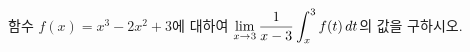 함수 $f(x)=x^3-2x^2+3$에 대하여 $\displaystyle\lim_{x\to 3}\dfrac{1}{x-3}\int_{x}^{3}f(t)\mkern3mu dt$의 값을 구하시오.
